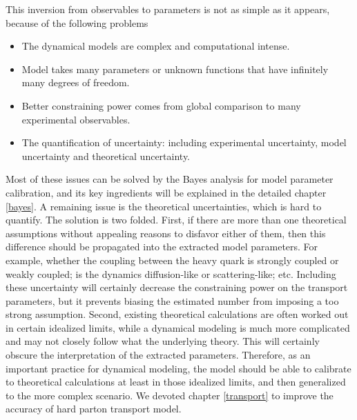 This inversion from observables to parameters is not as simple as it appears, because of the following problems
\begin{itemize}
\item The dynamical models are complex and computational intense.
\item Model takes many parameters or unknown functions that have infinitely many degrees of freedom.
\item Better constraining power comes from global comparison to many experimental observables.
\item The quantification of uncertainty: including experimental uncertainty, model uncertainty and theoretical uncertainty.
\end{itemize}
Most of these issues can be solved by the Bayes analysis for model parameter calibration, and its key ingredients will be explained in the detailed chapter \ref{bayes}.
A remaining issue is the theoretical uncertainties, which is hard to quantify.
The solution is two folded. 
First, if there are more than one theoretical assumptions without appealing reasons to disfavor either of them, then this difference should be propagated into the extracted model parameters.
For example, whether the coupling between the heavy quark is strongly coupled or weakly coupled; is the dynamics diffusion-like or scattering-like; etc.
Including these uncertainty will certainly decrease the constraining power on the transport parameters, but it prevents biasing the estimated number from imposing a too strong assumption.
Second, existing theoretical calculations are often worked out in certain idealized limits, while a dynamical modeling is much more complicated and may not closely follow what the underlying theory.
This will certainly obscure the interpretation of the extracted parameters.
Therefore, as an important practice for dynamical modeling, the model should be able to calibrate to theoretical calculations at least in those idealized limits, and then generalized to the more complex scenario.
We devoted chapter \ref{transport} to improve the accuracy of hard parton transport model.

